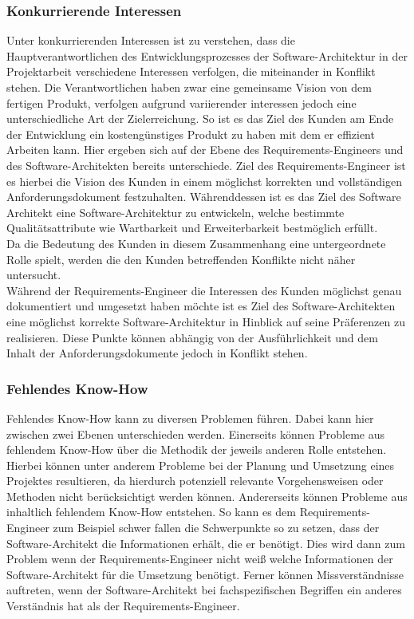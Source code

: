 \subsubsection{Konkurrierende Interessen}
Unter konkurrierenden Interessen ist zu verstehen, dass die Hauptverantwortlichen des Entwicklungsprozesses der Software-Architektur in der Projektarbeit verschiedene Interessen verfolgen, die miteinander in Konflikt stehen. Die Verantwortlichen haben zwar eine gemeinsame Vision von dem fertigen Produkt, verfolgen aufgrund variierender interessen jedoch eine unterschiedliche Art der Zielerreichung.
So ist es das Ziel des Kunden am Ende der Entwicklung ein kostengünstiges Produkt zu haben mit dem er effizient Arbeiten kann. Hier ergeben sich auf der Ebene des Requirements-Engineers und des Software-Architekten bereits unterschiede. Ziel des Requirements-Engineer ist es hierbei die Vision des Kunden in einem möglichst korrekten und vollständigen Anforderungsdokument festzuhalten. Währenddessen ist es das Ziel des Software Architekt eine Software-Architektur zu entwickeln, welche bestimmte Qualitätsattribute wie Wartbarkeit und Erweiterbarkeit bestmöglich erfüllt. \\
Da die Bedeutung des Kunden in diesem Zusammenhang eine untergeordnete Rolle spielt, werden die den Kunden betreffenden Konflikte nicht näher untersucht. \\
Während der Requirements-Engineer die Interessen des Kunden möglichst genau dokumentiert und umgesetzt haben möchte ist es Ziel des Software-Architekten eine möglichst korrekte Software-Architektur in Hinblick auf seine Präferenzen zu realisieren. Diese Punkte können abhängig von der Ausführlichkeit und dem Inhalt der Anforderungsdokumente jedoch in Konflikt stehen.

\subsubsection{Fehlendes Know-How}
Fehlendes Know-How kann zu diversen Problemen führen. Dabei kann hier zwischen zwei Ebenen unterschieden werden. Einerseits können Probleme aus fehlendem Know-How über die Methodik der jeweils anderen Rolle entstehen. Hierbei können unter anderem Probleme bei der Planung und Umsetzung eines Projektes resultieren, da hierdurch potenziell relevante Vorgehensweisen oder Methoden nicht berücksichtigt werden können. Andererseits können Probleme aus inhaltlich fehlendem Know-How entstehen. So kann es dem Requirements-Engineer zum Beispiel schwer fallen die Schwerpunkte so zu setzen, dass der Software-Architekt die Informationen erhält, die er benötigt. Dies wird dann zum Problem wenn der Requirements-Engineer nicht weiß welche Informationen der Software-Architekt für die Umsetzung benötigt. Ferner können Missverständnisse auftreten, wenn der Software-Architekt bei fachspezifischen Begriffen ein anderes Verständnis hat als der Requirements-Engineer. 

